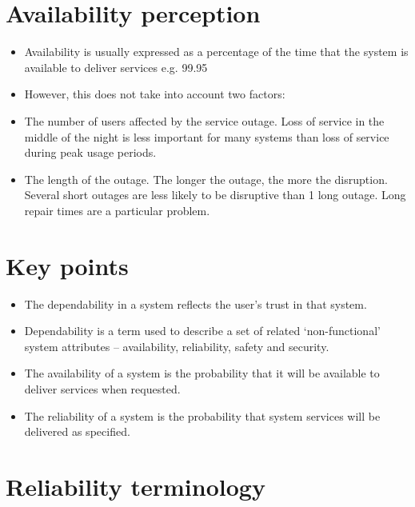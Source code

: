 \section{Availability perception}
\begin{itemize}
\item Availability is usually expressed as a percentage of the time that the system is available to deliver services e.g. 99.95%

\item However, this does not take into account two factors:

  \item The number of users affected by the service outage. Loss of service in the middle of the night is less important for many systems than loss of service during peak usage periods.
  \item The length of the outage. The longer the outage, the more the disruption. Several short outages are less likely to be disruptive than 1 long outage. Long repair times are a particular problem.

\end{itemize}
\section{Key points}
\begin{itemize}
\item The dependability in a system reflects the user’s trust in that system.

\item Dependability is a term used to describe a set of related ‘non-functional’ system attributes – availability, reliability, safety and security.

\item The availability of a system is the probability that it will be available to deliver services when requested.

\item The reliability of a system is the probability that system services will be delivered as specified.

\end{itemize}
\section{Reliability terminology}

